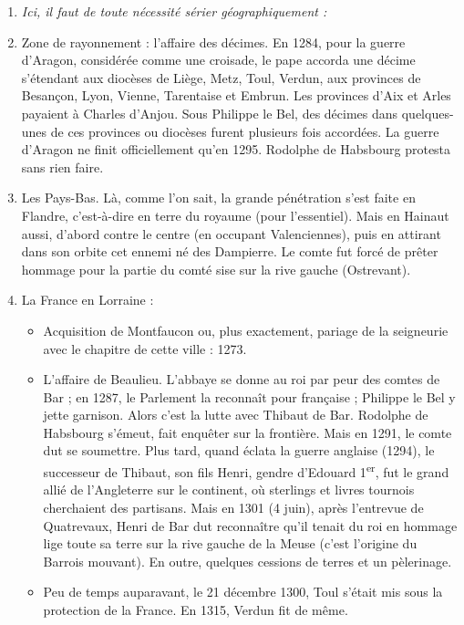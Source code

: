 \documentclass[french,twoside]{book} %
\newlength{\listmod}
\newcommand{\listhead}[1]{\hspace{-1\listmod}\emph{#1}}
\begin{document}
\begin{enumerate}[itemsep=\baselineskip,]
\item[]\listhead{Ici, il faut de toute nécessité sérier géographiquement :}
\item Zone de rayonnement : l’affaire des décimes. En 1284, pour la guerre d’Aragon, considérée comme une croisade, le pape accorda une décime s’étendant aux diocèses de Liège, Metz, Toul, Verdun, aux provinces de Besançon, Lyon, Vienne, Tarentaise et Embrun. Les provinces d’Aix et Arles payaient à Charles d’Anjou. Sous Philippe le Bel, des décimes dans quelques-unes de ces provinces ou diocèses furent plusieurs fois accordées. La guerre d’Aragon ne finit officiellement qu’en 1295. Rodolphe de Habsbourg protesta sans rien faire.
\item Les Pays-Bas. Là, comme l’on sait, la grande pénétration s’est faite en Flandre, c’est-à-dire en terre du royaume (pour l’essentiel). Mais en Hainaut aussi, d’abord contre le centre (en occupant Valenciennes), puis en attirant dans son orbite cet ennemi né des Dampierre. Le comte fut forcé de prêter hommage pour la partie du comté sise sur la rive gauche (Ostrevant).
\item La France en Lorraine : 
\begin{itemize}[itemsep=0pt,]
\item Acquisition de Montfaucon ou, plus exactement, pariage de la seigneurie avec le chapitre de cette ville : 1273.
\item L’affaire de Beaulieu. L’abbaye se donne au roi par peur des comtes de Bar ; en 1287, le Parlement la reconnaît pour française ; Philippe le Bel y jette garnison. Alors c’est la lutte avec Thibaut de Bar. Rodolphe de Habsbourg s’émeut, fait enquêter sur la frontière. Mais en 1291, le comte dut se soumettre. Plus tard, quand éclata la guerre anglaise (1294), le successeur de Thibaut,  
\label{p34} son fils Henri, gendre d’Edouard 1\textsuperscript{er}, fut le grand allié de l’Angleterre sur le continent, où sterlings et livres tournois cherchaient des partisans. Mais en 1301 (4 juin), après l’entrevue de Quatrevaux, Henri de Bar dut reconnaître qu’il tenait du roi en hommage lige toute sa terre sur la rive gauche de la Meuse (c’est l’origine du Barrois mouvant). En outre, quelques cessions de terres et un pèlerinage.
\item Peu de temps auparavant, le 21 décembre 1300, Toul s’était mis sous la protection de la France. En 1315, Verdun fit de même.
\end{itemize}
 

\end{enumerate}
\end{document}
